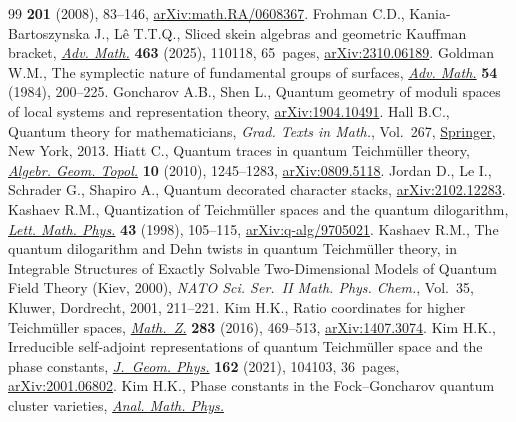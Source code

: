 \documentclass[pdftex]{sigma}
\numberwithin{equation}{section}
\theoremstyle{definition}
\begin{document}
\begin{thebibliography}{99}
 \textbf{201} (2008), 83--146,
 \href{http://arxiv.org/abs/math.RA/0608367}{arXiv:math.RA/0608367}.
Frohman C.D., Kania-Bartoszynska J., L\^{e} T.T.Q., Sliced skein algebras and
 geometric {K}auffman bracket,
 \href{https://doi.org/10.1016/j.aim.2025.110118}{\textit{Adv. Math.}}
 \textbf{463} (2025), 110118, 65~pages,
 \href{http://arxiv.org/abs/2310.06189}{arXiv:2310.06189}.
Goldman W.M., The symplectic nature of fundamental groups of surfaces,
 \href{https://doi.org/10.1016/0001-8708(84)90040-9}{\textit{Adv. Math.}}
 \textbf{54} (1984), 200--225.
Goncharov A.B., Shen L., Quantum geometry of moduli spaces of local systems and
 representation theory,
 \href{http://arxiv.org/abs/1904.10491}{arXiv:1904.10491}.
Hall B.C., Quantum theory for mathematicians, \textit{Grad. Texts in Math.},
 Vol.~267, \href{https://doi.org/10.1007/978-1-4614-7116-5}{Springer}, New
 York, 2013.
Hiatt C., Quantum traces in quantum {T}eichm\"{u}ller theory,
 \href{https://doi.org/10.2140/agt.2010.10.1245}{\textit{Algebr. Geom.
 Topol.}} \textbf{10} (2010), 1245--1283,
 \href{http://arxiv.org/abs/0809.5118}{arXiv:0809.5118}.
Jordan D., Le I., Schrader G., Shapiro A., Quantum decorated character stacks,
 \href{http://arxiv.org/abs/2102.12283}{arXiv:2102.12283}.
Kashaev R.M., Quantization of {T}eichm\"{u}ller spaces and the quantum
 dilogarithm, \href{https://doi.org/10.1023/A:1007460128279}{\textit{Lett.
 Math. Phys.}} \textbf{43} (1998), 105--115,
 \href{http://arxiv.org/abs/q-alg/9705021}{arXiv:q-alg/9705021}.
Kashaev R.M., The quantum dilogarithm and {D}ehn twists in quantum
 {T}eichm\"{u}ller theory, in Integrable Structures of Exactly Solvable
 Two-Dimensional Models of Quantum Field Theory ({K}iev, 2000), \textit{NATO
 Sci. Ser.~II Math. Phys. Chem.}, Vol.~35, Kluwer, Dordrecht, 2001, 211--221.
Kim H.K., Ratio coordinates for higher {T}eichm\"{u}ller spaces,
 \href{https://doi.org/10.1007/s00209-015-1607-4}{\textit{Math.~Z.}}
 \textbf{283} (2016), 469--513,
 \href{http://arxiv.org/abs/1407.3074}{arXiv:1407.3074}.
Kim H.K., Irreducible self-adjoint representations of quantum {T}eichm\"{u}ller
 space and the phase constants,
 \href{https://doi.org/10.1016/j.geomphys.2021.104103}{\textit{J.~Geom.
 Phys.}} \textbf{162} (2021), 104103, 36~pages,
 \href{http://arxiv.org/abs/2001.06802}{arXiv:2001.06802}.
Kim H.K., Phase constants in the {F}ock--{G}oncharov quantum cluster varieties,
 \href{https://doi.org/10.1007/s13324-020-00439-3}{\textit{Anal. Math. Phys.}}

\end{thebibliography}
\end{document}
